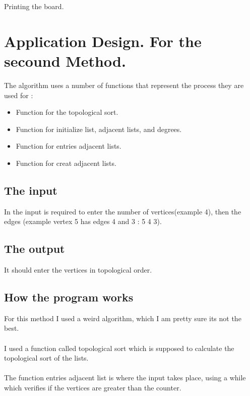 \documentclass{report}
\begin{document}
\begin{algorithm}[H]
     
    \caption{Printing the board.}
\end{algorithm}

\chapter*{Application Design. For the secound Method.}

The algorithm uses a number of functions that represent the process they are used for :
\begin{itemize}
   \item Function for the topological sort.
   \item Function for initialize list, adjacent lists, and degrees.
   \item Function for entries adjacent lists.
   \item Function for creat adjacent lists.
\end{itemize}

\section*{The input}
In the input is required to enter the number of vertices(example 4), then the edges (example vertex 5 has edges 4 and 3 : 5 4 3).

\section*{The output}

It should enter the vertices in topological order.

\section*{How the program works}

For this method I used a weird algorithm, which I am pretty sure its not the best.
\\\\
I used a function called topological sort which is supposed to calculate the topological sort of the lists.
\\\\
The function entries adjacent list is where the input takes place, using a while which verifies if the vertices are greater than the counter.
\end{document}
